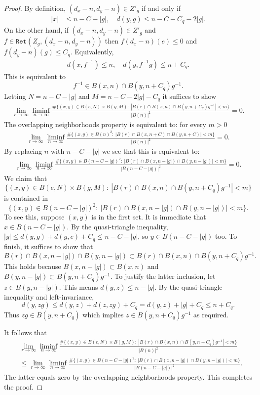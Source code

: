 \documentclass[12pt]{article}
\theoremstyle{plain}
\theoremstyle{definition}
\theoremstyle{remark}
\newcommand\Ret{\mathtt{Ret}}
\begin{document}
\begin{proof}
By definition, $(d_x-n,d_y-n) \in Z'_g$ if and only if 
\begin{align*}
    |x| &\le n - C-|g|,\quad 
    d(y,g)  \le n - C - C_q- 2|g|.
    \end{align*}
On the other hand, if $(d_x-n,d_y-n)\in Z'_g$ and $f \in \Ret(Z_g, (d_x-n,d_y-n))$ then $f(d_x-n)(e)\le 0$ and $f(d_y-n)(g)\le C_q$. Equivalently, 
\begin{align*}
d(x,f^{-1})\le n, \quad d(y,f^{-1}g)\le n+C_q.
\end{align*}
This is equivalent to
$$f^{-1} \in B(x,n) \cap B(y,n+C_q)g^{-1}.$$
Letting $N=n-C-|g|$ and $M=n-C-2|g|-C_q$ it suffices to show
\begin{align*}
\lim_{r\to\infty} \liminf_{n\to\infty}  \frac{\#\{(x,y) \in B(e,N)\times B(g,M):~|B(r) \cap B(x,n) \cap B(y,n+C_q)g^{-1}| < m\}}{|B(n)|^2} =0.
\end{align*}
The overlapping neighborhoods property is equivalent to: for every $m>0$
\begin{align*}
\lim_{r\to\infty} \liminf_{n\to\infty}  \frac{\#\{(x,y) \in B(n)^2:~|B(r) \cap B(x,n+C) \cap B(y,n+C)| < m\}}{|B(n)|^2} =0.
\end{align*}
By replacing $n$ with $n-C-|g|$ we see that this is equivalent to:
\begin{align*}
\lim_{r\to\infty} \liminf_{n\to\infty}  \frac{\#\{(x,y) \in B(n-C-|g|)^2:~|B(r) \cap B(x,n-|g|) \cap B(y,n-|g|)| < m\}}{|B(n-C-|g|)|^2} =0.
\end{align*}
We claim that
$$\{(x,y) \in B(e,N)\times B(g,M):~|B(r) \cap B(x,n) \cap B(y,n+C_q)g^{-1}| < m\}$$
is contained in
$$\{(x,y) \in B(n-C-|g|)^2:~|B(r) \cap B(x,n-|g|) \cap B(y,n-|g|)| < m\}.$$
To see this, suppose $(x,y)$ is in the first set. It is immediate that $x\in B(n-C-|g|)$. By the quasi-triangle inequality, $|y| \leq d(y,g)+d(g,e)+C_q\leq n-C-|g|$, so $y\in B(n-C-|g|)$ too. To finish, it suffices to show that
$$B(r) \cap B(x,n-|g|) \cap B(y,n-|g|) \subset B(r) \cap B(x,n) \cap B(y,n+C_q)g^{-1}.$$
This holds because $B(x,n-|g|) \subset B(x,n)$ and $B(y,n-|g|) \subset  B(y,n+C_q)g^{-1}$. To justify the latter inclusion, let $z \in B(y,n-|g|)$. This means $d(y,z)\le n-|g|$. By the quasi-triangle inequality and left-invariance,
$$d(y,zg) \le d(y,z) + d(z,zg)+C_q = d(y,z) + |g|+C_q \le n+C_q.$$
Thus $zg \in B(y,n+C_q)$ which implies $z \in B(y,n+C_q)g^{-1}$ as required.

It follows that 
\begin{align*}
&\lim_{r\to\infty} \liminf_{n\to\infty}  \frac{\#\{(x,y) \in B(e,N)\times B(g,M):~|B(r) \cap B(x,n) \cap B(y,n+C_q)g^{-1}| < m\}}{|B(n)|^2} \\
&\leq \lim_{r\to\infty} \liminf_{n\to\infty} \frac{\#\{(x,y) \in B(n-C-|g|)^2:~|B(r) \cap B(x,n-|g|) \cap B(y,n-|g|)| < m\}}{|B(n-C-|g|)|^2}.
\end{align*}
The latter equals zero by the overlapping neighborhoods property. This completes the proof.
\end{proof}
\end{document}
